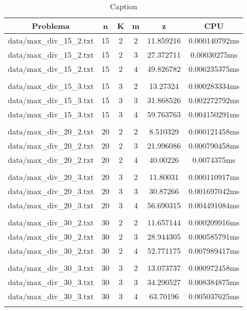 \begin{table}[h]
\centering
\begin{tabular}{|c|c|c|c|c|c|}
\hline
Problema &  n &  K &  m &  z &  CPU \\
\hline
data/max\_div\_15\_2.txt &  15 &  2 &  2 &  11.859216 &  0.000140792ms \\
data/max\_div\_15\_2.txt &  15 &  2 &  3 &  27.372711 &  0.00030275ms \\
data/max\_div\_15\_2.txt &  15 &  2 &  4 &  49.826782 &  0.006235375ms \\
 \\
data/max\_div\_15\_3.txt &  15 &  3 &  2 &  13.27324 &  0.000283334ms \\
data/max\_div\_15\_3.txt &  15 &  3 &  3 &  31.868526 &  0.002272792ms \\
data/max\_div\_15\_3.txt &  15 &  3 &  4 &  59.763763 &  0.004150291ms \\
 \\
data/max\_div\_20\_2.txt &  20 &  2 &  2 &  8.510329 &  0.000121458ms \\
data/max\_div\_20\_2.txt &  20 &  2 &  3 &  21.996086 &  0.000790458ms \\
data/max\_div\_20\_2.txt &  20 &  2 &  4 &  40.00226 &  0.0074375ms \\
 \\
data/max\_div\_20\_3.txt &  20 &  3 &  2 &  11.80031 &  0.000110917ms \\
data/max\_div\_20\_3.txt &  20 &  3 &  3 &  30.87266 &  0.001697042ms \\
data/max\_div\_20\_3.txt &  20 &  3 &  4 &  56.690315 &  0.004491084ms \\
 \\
data/max\_div\_30\_2.txt &  30 &  2 &  2 &  11.657144 &  0.000209916ms \\
data/max\_div\_30\_2.txt &  30 &  2 &  3 &  28.944305 &  0.000585791ms \\
data/max\_div\_30\_2.txt &  30 &  2 &  4 &  52.771175 &  0.007989417ms \\
 \\
data/max\_div\_30\_3.txt &  30 &  3 &  2 &  13.073737 &  0.000972458ms \\
data/max\_div\_30\_3.txt &  30 &  3 &  3 &  34.290527 &  0.008384875ms \\
data/max\_div\_30\_3.txt &  30 &  3 &  4 &  63.70196 &  0.005037625ms \\
 \\
\hline
\end{tabular}
\caption{Caption}
\label{tab:my_table}
\end{table}